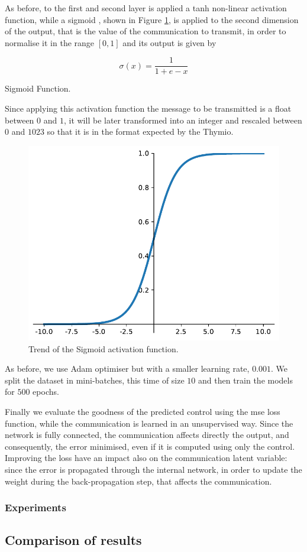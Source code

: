As before, to the first and second layer is applied a tanh non-linear activation 
function, while a sigmoid \cite[see][]{han1995influence}, shown in Figure 
\ref{fig:sigmoid}, is applied to the second dimension of the output, that is the 
value of the communication to transmit, in order to normalise it in the range $[0, 
1]$ and its output is given by
\begin{Equation}[htb]
	\centering
	\begin{equation}
	\sigma(x)= \frac{1}{1 + e - x}
	\end{equation}
	\caption{Sigmoid Function.}
	\label{eq:sigmoid}
\end{Equation}

\noindent
Since applying this activation function the message to be transmitted is a float 
between $0$ and $1$, it will be later transformed into an integer and rescaled 
between $0$ and $1023$ so that it is in the format expected by the Thymio.

\begin{figure}[htb]
	\centering
	\includegraphics[width=.5\textwidth]{contents/images/sigmoid2}%
	\caption{Trend of the Sigmoid activation function.}
	\label{fig:sigmoid}
\end{figure}

As before, we use Adam optimiser but with a smaller learning rate, $0.001$. We 
split the dataset in mini-batches, this time of size $10$ and then train the models 
for $500$ epochs. 

Finally we evaluate the goodness of the predicted control using the \gls{mse} loss 
function, while the communication is learned in an unsupervised way.
Since the network is fully connected, the communication affects directly the 
output, and consequently, the error minimised, even if it is computed using only 
the control. Improving the loss have an impact also on the communication latent 
variable: since the error is propagated through the internal network, in order to 
update the weight during the back-propagation step, that affects the 
communication.

\subsubsection{Experiments}
\label{subsubsec:expcomm}

\subsection{Comparison of results}
\label{subsec:results1}
